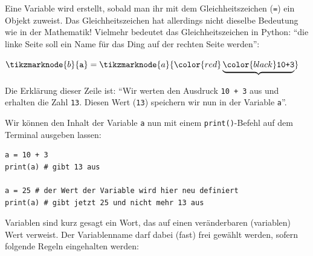 Eine Variable wird erstellt, sobald man ihr mit dem Gleichheitszeichen (\lstinline|=|) ein Objekt zuweist. Das Gleichheitszeichen hat allerdings nicht dieselbe Bedeutung wie in der Mathematik! Vielmehr bedeutet das Gleichheitszeichen in Python: \enquote{die linke Seite soll ein Name für das Ding auf der rechten Seite werden}:
\begin{center}
	$ \tikzmarknode{b}{\text{\texttt{a}}} =\tikzmarknode{a}{\color{red}\underbrace{\color{black}\text{\texttt{10+3}}}}$
\end{center}

Die Erklärung dieser Zeile ist: \enquote{Wir werten den Ausdruck \lstinline|10 + 3| aus und erhalten die Zahl \lstinline|13|. Diesen Wert (\lstinline|13|) speichern wir nun in der Variable \lstinline|a|}.

Wir können den Inhalt der Variable \lstinline|a| nun mit einem \lstinline|print()|-Befehl auf dem Terminal ausgeben lassen:

\begin{lstlisting}
a = 10 + 3
print(a) # gibt 13 aus

a = 25 # der Wert der Variable wird hier neu definiert
print(a) # gibt jetzt 25 und nicht mehr 13 aus
\end{lstlisting}

Variablen sind kurz gesagt ein Wort, das auf einen veränderbaren (variablen) Wert verweist. Der Variablenname darf dabei (fast) frei gewählt werden, sofern folgende Regeln eingehalten werden:

